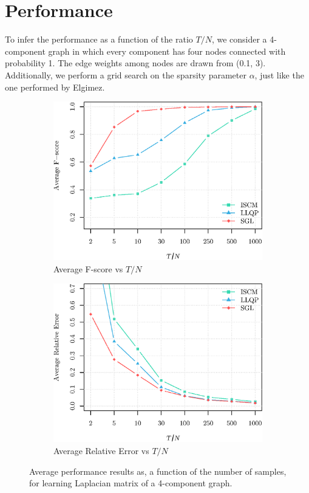 \section{Performance}
To infer the performance as a function of the ratio $T/N$, we consider a 4-component graph in which every component has
four nodes connected with probability 1. The edge weights among nodes are drawn from (0.1, 3). Additionally,
we perform a grid search on the sparsity parameter $\alpha$, just like the one performed by Elgimez.

\begin{figure}[!htb]
  \begin{subfigure}[b]{0.45\textwidth}
      \includegraphics[width=\textwidth]{block-diagonal/latex/figures/fscore_block_diagonal.eps}
      \caption{Average F-score vs $T/N$}
  \end{subfigure}
  \begin{subfigure}[b]{0.45\textwidth}
      \includegraphics[width=\textwidth]{block-diagonal/latex/figures/relative_error_block_diagonal.eps}
      \caption{Average Relative Error vs $T/N$}
  \end{subfigure}
  \caption{Average performance results as, a function of the number of samples, for learning
           Laplacian matrix of a 4-component graph.}
  \label{fig:performance}
\end{figure}
